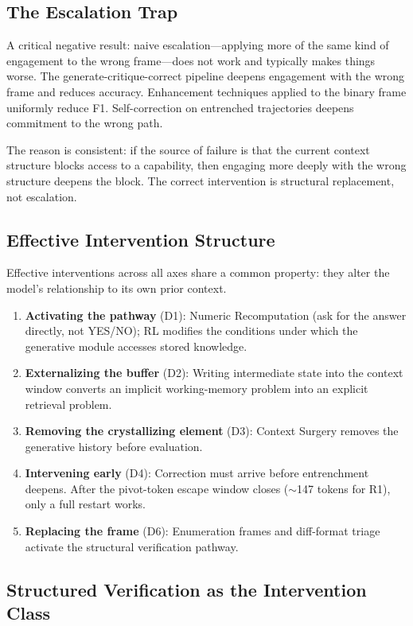 \documentclass[11pt]{article}
\begin{document}
\subsection{The Escalation Trap}

A critical negative result: naive escalation---applying more of the same
kind of engagement to the wrong frame---does not work and typically makes
things worse. The generate-critique-correct pipeline deepens engagement
with the wrong frame and reduces accuracy. Enhancement techniques applied
to the binary frame uniformly reduce F1. Self-correction on entrenched
trajectories deepens commitment to the wrong path.

The reason is consistent: if the source of failure is that the current
context structure blocks access to a capability, then engaging more deeply
with the wrong structure deepens the block. The correct intervention is
structural replacement, not escalation.

\subsection{Effective Intervention Structure}

Effective interventions across all axes share a common property: they
alter the model's relationship to its own prior context.

\begin{enumerate}[noitemsep, topsep=2pt]
\item \textbf{Activating the pathway} (D1): Numeric Recomputation (ask
for the answer directly, not YES/NO); RL modifies the conditions under
which the generative module accesses stored knowledge.
\item \textbf{Externalizing the buffer} (D2): Writing intermediate state
into the context window converts an implicit working-memory problem into
an explicit retrieval problem.
\item \textbf{Removing the crystallizing element} (D3): Context Surgery
removes the generative history before evaluation.
\item \textbf{Intervening early} (D4): Correction must arrive before
entrenchment deepens. After the pivot-token escape window closes
($\sim$147 tokens for R1), only a full restart works.
\item \textbf{Replacing the frame} (D6): Enumeration frames and
diff-format triage activate the structural verification pathway.
\end{enumerate}

\subsection{Structured Verification as the Intervention Class}
\end{document}
